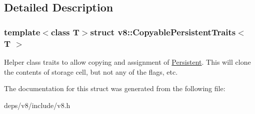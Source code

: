 \subsection{Detailed Description}
\subsubsection*{template$<$class T$>$struct v8\+::\+Copyable\+Persistent\+Traits$<$ T $>$}

Helper class traits to allow copying and assignment of \hyperlink{classv8_1_1_persistent}{Persistent}. This will clone the contents of storage cell, but not any of the flags, etc. 

The documentation for this struct was generated from the following file\+:\begin{DoxyCompactItemize}
\item 
deps/v8/include/v8.\+h\end{DoxyCompactItemize}
